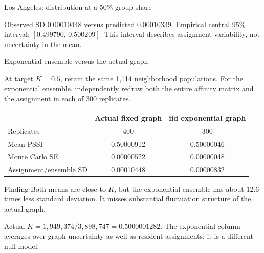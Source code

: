\documentclass[aspectratio=169,10pt]{beamer}
\begin{document}
\begin{frame}{Los Angeles: distribution at a 50\% group share}
\begin{center}
\end{center}\footnotesize Observed SD $0.00010448$ versus predicted $0.00010339$. Empirical central 95\% interval: $[0.499790,\,0.500209]$. This interval describes assignment variability, not uncertainty in the mean.
\end{frame}

\begin{frame}{Exponential ensemble versus the actual graph}
\small

At target $K=0.5$, retain the same 1,114 neighborhood populations.
For the exponential ensemble, independently redraw both the entire affinity matrix and the assignment in each of 300 replicates.
\begin{center}\begin{tabular}{lcc}
 & Actual fixed graph & iid exponential graph\\\hline
Replicates & 400 & 300\\
Mean PSSI & 0.50000912 & 0.50000046\\
Monte Carlo SE & 0.00000522 & 0.00000048\\
Assignment/ensemble SD & 0.00010448 & 0.00000832\\
\end{tabular}\end{center}
\begin{block}{Finding}
Both means are close to $K$, but the exponential ensemble has about 12.6 times less standard deviation. It misses substantial fluctuation structure of the actual graph.
\end{block}
\footnotesize Actual $K=1{,}949{,}374/3{,}898{,}747=0.5000001282$. The exponential column averages over graph uncertainty as well as resident assignments; it is a different null model.

\end{frame}
\end{document}

